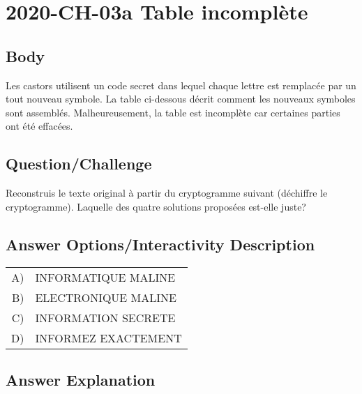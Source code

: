 \documentclass[a4paper,11pt]{report}
\newcommand{\taskGraphicsFolder}{..}
\begin{document}
\section*{\centering{} 2020-CH-03a Table incomplète}


\subsection*{Body}

Les castors utilisent un code secret dans lequel chaque lettre est remplacée par un tout nouveau symbole. La table ci-dessous décrit comment les nouveaux symboles sont assemblés. Malheureusement, la table est incomplète car certaines parties ont été effacées.

{\centering%
\par}

{\em

\subsection*{Question/Challenge}

Reconstruis le texte original à partir du cryptogramme suivant (déchiffre le cryptogramme). Laquelle des quatre solutions proposées est-elle juste?

{\centering%
\par}

}\begingroup
\renewcommand{\arraystretch}{1.5}
\subsection*{Answer Options/Interactivity Description}

\begin{tabular}{ @{} r l @{} }
  A) & INFORMATIQUE MALINE \\ 
  B) & ELECTRONIQUE MALINE \\ 
  C) & INFORMATION SECRETE \\ 
  D) & INFORMEZ EXACTEMENT
\end{tabular}

\endgroup

\subsection*{Answer Explanation}
\end{document}
